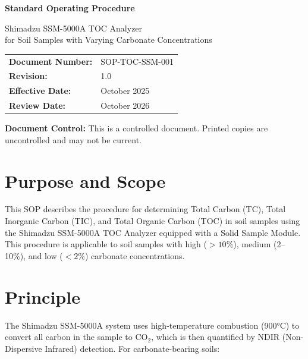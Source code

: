 \documentclass[11pt,a4paper]{article}\usepackage[]{graphicx}\usepackage[]{xcolor}
\begin{document}
\begin{titlepage}
    \centering
    \vspace*{2cm}
    
    {\Huge\bfseries Standard Operating Procedure\par}
    \vspace{1cm}
    {\Large Shimadzu SSM-5000A TOC Analyzer\\for Soil Samples with Varying Carbonate Concentrations\par}
    \vspace{2cm}
    
    \begin{tabular}{ll}
        \toprule
        \textbf{Document Number:} & SOP-TOC-SSM-001 \\
        \textbf{Revision:} & 1.0 \\
        \textbf{Effective Date:} & October 2025 \\
        \textbf{Review Date:} & October 2026 \\
        \bottomrule
    \end{tabular}
    
    \vfill
    
    {\large \textbf{Document Control:} This is a controlled document. Printed copies are uncontrolled and may not be current.\par}
    
\end{titlepage}

\tableofcontents
\newpage

\section{Purpose and Scope}

This SOP describes the procedure for determining Total Carbon (TC), Total Inorganic Carbon (TIC), and Total Organic Carbon (TOC) in soil samples using the Shimadzu SSM-5000A TOC Analyzer equipped with a Solid Sample Module. This procedure is applicable to soil samples with high ($>10\%$), medium (2--10\%), and low ($<2\%$) carbonate concentrations.

\section{Principle}

The Shimadzu SSM-5000A system uses high-temperature combustion (900°C) to convert all carbon in the sample to CO$_2$, which is then quantified by NDIR (Non-Dispersive Infrared) detection. For carbonate-bearing soils:
\end{document}
